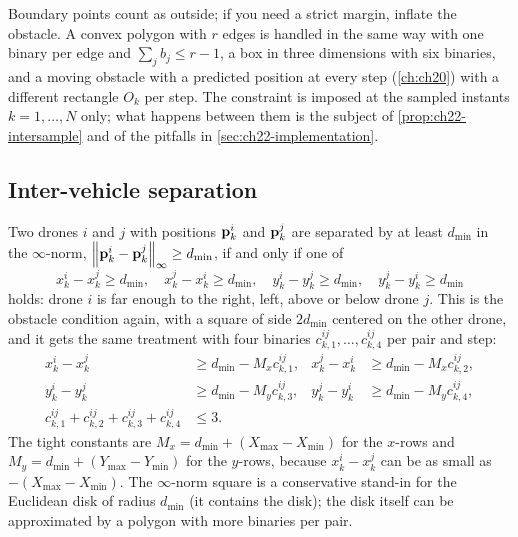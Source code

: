 Boundary points count as outside; if you need a strict margin, inflate the
obstacle. A convex polygon with $r$ edges is handled in the same way with
one binary per edge and $\sum_j b_j \le r - 1$, a box in three dimensions
with six binaries, and a moving obstacle with a predicted position at every
step (\cref{ch:ch20}) with a different rectangle $O_k$ per step. The
constraint is imposed at the sampled instants $k = 1, \dots, N$ only; what
happens between them is the subject of \cref{prop:ch22-intersample} and of
the pitfalls in \cref{sec:ch22-implementation}.

\subsection{Inter-vehicle separation}
\label{sec:ch22-separation}

Two drones $i$ and $j$ with positions $\mathbf{p}^i_k$ and $\mathbf{p}^j_k$ are separated
by at least $d_{\min}$ in the $\infty$-norm, $\left\lVert \mathbf{p}^i_k -
\mathbf{p}^j_k \right\rVert_\infty \ge d_{\min}$, if and only if one of
\begin{equation}
  x^i_k - x^j_k \ge d_{\min}, \quad
  x^j_k - x^i_k \ge d_{\min}, \quad
  y^i_k - y^j_k \ge d_{\min}, \quad
  y^j_k - y^i_k \ge d_{\min}
  \label{eq:ch22-sep-sides}
\end{equation}
holds: drone $i$ is far enough to the right, left, above or below drone
$j$. This is the obstacle condition again,
with a square of side $2 d_{\min}$ centered on the other drone, and it gets
the same treatment with four binaries $c^{ij}_{k,1}, \dots, c^{ij}_{k,4}$
per pair and step:
\begin{equation}
\begin{aligned}
  x^i_k - x^j_k &\ge d_{\min} - M_x c^{ij}_{k,1}, &
  x^j_k - x^i_k &\ge d_{\min} - M_x c^{ij}_{k,2},\\
  y^i_k - y^j_k &\ge d_{\min} - M_y c^{ij}_{k,3}, &
  y^j_k - y^i_k &\ge d_{\min} - M_y c^{ij}_{k,4},\\
  c^{ij}_{k,1} + c^{ij}_{k,2} + c^{ij}_{k,3} + c^{ij}_{k,4} &\le 3.
\end{aligned}
\label{eq:ch22-sep}
\end{equation}
The tight constants are $M_x = d_{\min} + (X_{\max} - X_{\min})$ for the
$x$-rows and $M_y = d_{\min} + (Y_{\max} - Y_{\min})$ for the $y$-rows, because
$x^i_k - x^j_k$ can be as small as $-(X_{\max} - X_{\min})$. The
$\infty$-norm square is a conservative stand-in for the Euclidean disk of
radius $d_{\min}$ (it contains the disk); the disk itself can be
approximated by a polygon with more binaries per pair.


